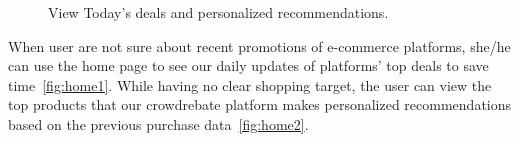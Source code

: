 \begin{figure}[t!]
	\caption{View Today's deals and personalized recommendations.}\vspace{-3ex}
	\label{fig:home}
\end{figure}
When user are not sure about recent promotions of e-commerce platforms, she/he can use the home page to see our daily updates of platforms' top deals to save time~\ref{fig:home1}. While having no clear shopping target, the user can view the top products that our crowdrebate platform makes personalized recommendations based on the previous purchase data~\ref{fig:home2}.

